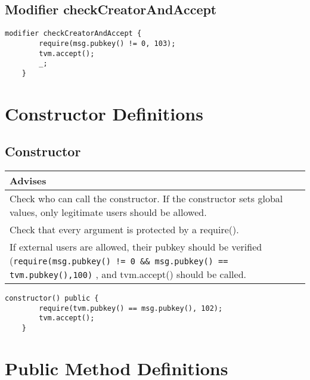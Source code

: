 \subsection{Modifier checkCreatorAndAccept}


\begin{lstlisting}[firstnumber=58]
	modifier checkCreatorAndAccept {
		require(msg.pubkey() != 0, 103);
		tvm.accept();
		_;
	}
\end{lstlisting}

\section{Constructor Definitions}


\subsection{Constructor}


\ifsoldraft
\noindent\begin{tabular}{|p{12cm}|}\hline
\rowcolor{green}Advises
\\\hline
Check who can call the constructor. If the constructor sets global values, only legitimate users should be allowed.
\\\hline
Check that every argument is protected by a require().
\\\hline
If external users are allowed, their pubkey should be verified (\verb+require(msg.pubkey() != 0 && msg.pubkey() == tvm.pubkey(),100)+ , and tvm.accept() should be called.
\\\hline\end{tabular}
\fi
\vspace{2cm}

\begin{lstlisting}[firstnumber=65]
	constructor() public {
		require(tvm.pubkey() == msg.pubkey(), 102);
		tvm.accept();
	}
\end{lstlisting}

\section{Public Method Definitions}


